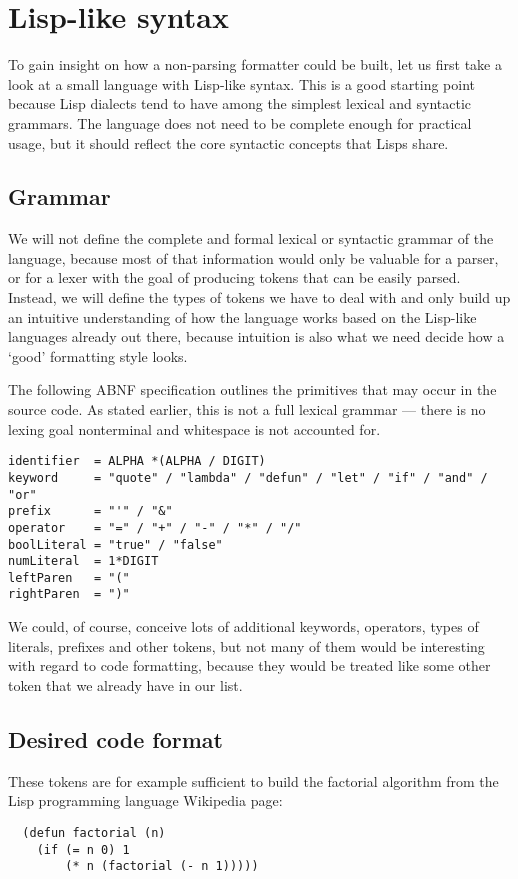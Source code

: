 \chapter{Lisp-like syntax}
To gain insight on how a non-parsing formatter could be built,
let us first take a look at a small language with Lisp-like syntax.
This is a good starting point because Lisp dialects tend to
have among the simplest lexical and syntactic grammars.
The language does not need to be complete enough for practical usage,
but it should reflect the core syntactic concepts that Lisps share.

\section{Grammar}
We will not define the complete and formal lexical or syntactic grammar of the language,
because most of that information would only be valuable for a parser,
or for a lexer with the goal of producing tokens that can be easily parsed.
Instead, we will define the types of tokens we have to deal with
and only build up an intuitive understanding of how the language works
based on the Lisp-like languages already out there,
because intuition is also what we need decide how a `good' formatting style looks.

The following ABNF specification outlines the primitives that may occur in the source code.
As stated earlier, this is not a full lexical grammar ---
there is no lexing goal nonterminal and whitespace is not accounted for.

\begin{verbatim}
identifier  = ALPHA *(ALPHA / DIGIT)
keyword     = "quote" / "lambda" / "defun" / "let" / "if" / "and" / "or"
prefix      = "'" / "&"
operator    = "=" / "+" / "-" / "*" / "/"
boolLiteral = "true" / "false"
numLiteral  = 1*DIGIT
leftParen   = "("
rightParen  = ")"
\end{verbatim}

We could, of course, conceive lots of additional keywords, operators,
types of literals, prefixes and other tokens,
but not many of them would be interesting with regard to code formatting,
because they would be treated like some other token that we already have in our list.

\section{Desired code format}
These tokens are for example sufficient to build the factorial algorithm
from the Lisp programming language Wikipedia page:
\begin{verbatim}
  (defun factorial (n)
    (if (= n 0) 1
        (* n (factorial (- n 1)))))
\end{verbatim}

